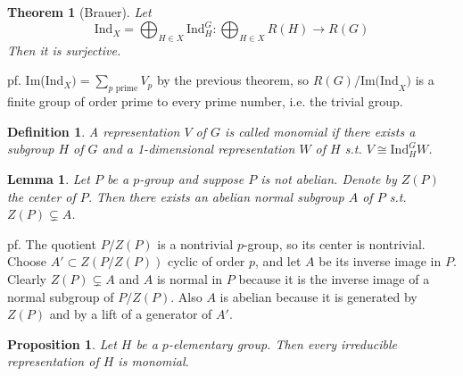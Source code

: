 \documentclass[12pt,letterpaper]{report}
\newtheorem{definition}{Definition}[section]
\newtheorem{lemma}{Lemma}[section]
\newtheorem{theorem}{Theorem}[section]
\newtheorem{proposition}{Proposition}[section]
\begin{document}
\begin{theorem}[Brauer]Let \begin{equation*}\text{Ind}_{X}=\bigoplus_{H\in X}\text{Ind}_{H}^{G}:\bigoplus_{H\in X}R(H)\rightarrow R(G)\end{equation*} Then it is surjective.\end{theorem}
pf. Im(Ind$_{X})=\sum_{p\,\,\text{prime}}V_{p}$ by the previous theorem, so $R(G)/\text{Im(Ind}_{X})$ is a finite group of order prime to every prime number, i.e. the trivial group. 
\begin{definition}A representation $V$ of $G$ is called monomial if there exists a subgroup $H$ of $G$ and a 1-dimensional representation $W$ of $H$ s.t. $V\cong\text{Ind}_{H}^{G}W$.\end{definition}
\begin{lemma}Let $P$ be a $p$-group and suppose $P$ is not abelian. Denote by $Z(P)$ the center of $P$. Then there exists an abelian normal subgroup $A$ of $P$ s.t. $Z(P)\subsetneq A$.\end{lemma}
pf. The quotient $P/Z(P)$ is a nontrivial $p$-group, so its center is nontrivial. Choose $A'\subset Z(P/Z(P))$ cyclic of order $p$, and let $A$ be its inverse image in $P$. Clearly $Z(P)\subsetneq A$ and $A$ is normal in $P$ because it is the inverse image of a normal subgroup of $P/Z(P)$. Also $A$ is abelian because it is generated by $Z(P)$ and by a lift of a generator of $A'$. 
\begin{proposition}Let $H$ be a $p$-elementary group. Then every irreducible representation of $H$ is monomial.\end{proposition}
\end{document}
